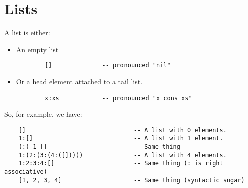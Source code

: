 \documentclass[letterpaper]{article}
\begin{document}
\section{Lists}
A list is either: 
\begin{itemize}
    \item An empty list
    \begin{verbatim}
        []              -- pronounced "nil"\end{verbatim}

    \item Or a head element attached to a tail list.
    \begin{verbatim}
        x:xs            -- pronounced "x cons xs"\end{verbatim}
\end{itemize}
So, for example, we have: 
\begin{verbatim}
    []                              -- A list with 0 elements. 
    1:[]                            -- A list with 1 element. 
    (:) 1 []                        -- Same thing 
    1:(2:(3:(4:([]))))              -- A list with 4 elements. 
    1:2:3:4:[]                      -- Same thing (: is right associative)
    [1, 2, 3, 4]                    -- Same thing (syntactic sugar)
\end{verbatim}
\end{document}

